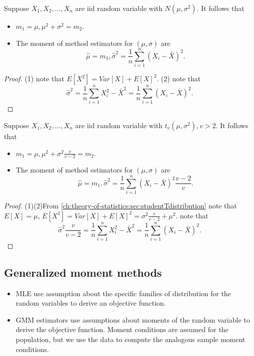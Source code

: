 \begin{refsection}
\begin{lemma}\cite[312]{casella2002statistical}
	Suppose $X_1,X_2,...,X_n$ are iid random variable with $N(\mu, \sigma^2)$. It follows that
	\begin{itemize}
		\item $m_1 = \mu, \mu^2 + \sigma^2 = m_2$.
		\item The moment of method estimators for $(\mu, \sigma)$ are
		$$\hat{\mu} = m_1, \hat{\sigma}^2 = \frac{1}{n}\sum_{i=1}^n (X_i - \bar{X})^2.$$
	\end{itemize}	
\end{lemma}
\begin{proof}
	(1) note that $E[X^2] = Var[X] + E[X]^2$.
	(2) note that 
	$$\hat{\sigma}^2 = \frac{1}{n}\sum_{i=1}^n X_i^2 - \bar{X}^2 = \frac{1}{n}\sum_{i=1}^n (X_i - \bar{X})^2.$$
\end{proof}



\begin{lemma}\label{ch:theory-of-statistics:th:methodOfMomentsStudentTEstimation}
	Suppose $X_1,X_2,...,X_n$ are iid random variable with $t_v(\mu, \sigma^2),v > 2$. It follows that
	\begin{itemize}
		\item $m_1 = \mu, \mu^2 + \sigma^2\frac{v}{v-2} = m_2$.
		\item The moment of method estimators for $(\mu, \sigma)$ are
		$$\hat{\mu} = m_1, \hat{\sigma}^2 = \frac{1}{n}\sum_{i=1}^n (X_i - \bar{X})^2 \frac{v-2}{v}.$$
	\end{itemize}		
	
\end{lemma}
\begin{proof}
	(1)(2)From \autoref{ch:theory-of-statistics:sec:studentTdistribution} note that $E[X] = \mu$, $E[X^2] = Var[X] + E[X]^2 = \sigma^2\frac{v}{v-2} + \mu^2$.
	note that 
	$$\hat{\sigma}^2\frac{v}{v-2} = \frac{1}{n}\sum_{i=1}^n X_i^2 - \bar{X}^2 = \frac{1}{n}\sum_{i=1}^n (X_i - \bar{X})^2.$$
\end{proof}


\subsection{Generalized moment methods}

\begin{remark}\hfill
\begin{itemize}
	\item MLE use assumption about the specific families of distribution for the random variables to derive an objective function. 
	\item GMM estimators use assumptions about moments of the random variable to derive the objective function.  Moment conditions are assumed for the population, but we use the data to compute the analogous sample moment conditions.


\end{itemize}
\end{remark}
\end{refsection}
